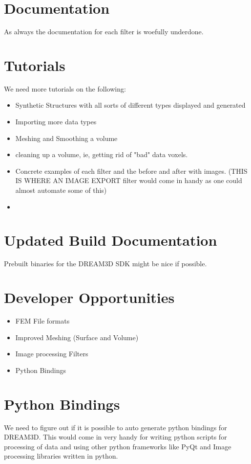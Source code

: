 \documentclass[12pt]{article} %
\begin{document}
\section{Documentation}
  As always the documentation for each filter is woefully underdone.
  
\section{Tutorials}
  We need more tutorials on the following:
  \begin{itemize}
  \item Synthetic Structures with all sorts of different types displayed and generated
  \item Importing more data types
  \item Meshing and Smoothing a volume
  \item cleaning up a volume, ie, getting rid of "bad" data voxels.
  \item Concrete examples of each filter and the before and after with images. (THIS IS WHERE AN IMAGE EXPORT filter would come in handy as one could almost automate some of this)
  \item 
  \end{itemize}


\section{Updated Build Documentation}
  Prebuilt binaries for the DREAM3D SDK might be nice if possible.
  
\section{Developer Opportunities}
  \begin{itemize}
  \item FEM File formats
  \item Improved Meshing (Surface and Volume)
  \item Image processing Filters
  \item Python Bindings
  \end{itemize}
  
\section{Python Bindings}
  We need to figure out if it is possible to auto generate python bindings for DREAM3D. This would come in very handy for writing python scripts for processing of data and using other python frameworks like PyQt and Image processing libraries written in python.
\end{document}
